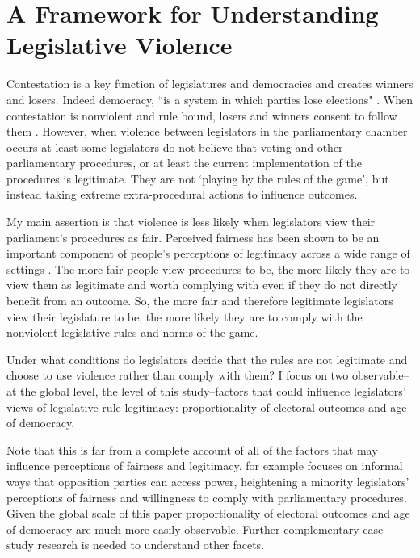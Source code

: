 \documentclass[a4paper]{article}\usepackage{graphicx, color}
\begin{document}

\section{A Framework for Understanding Legislative Violence}

Contestation is a key function of legislatures and democracies \citep{Alvarez1996, Dahl1971, Follesdal2006} and creates winners and losers. Indeed democracy, ``is a system in which parties lose elections" \citep[][10]{Przeworski1991}. When contestation is nonviolent and rule bound, losers and winners consent to follow them \citep[c.f.][]{Anderson2005}. However, when violence between legislators in the parliamentary chamber occurs at least some legislators do not believe that voting and other parliamentary procedures, or at least the current implementation of the procedures is legitimate. They are not `playing by the rules of the game', but instead taking extreme extra-procedural actions to influence outcomes.

My main assertion is that violence is less likely when legislators view their parliament's procedures as fair. Perceived fairness has been shown to be an important component of people's perceptions of legitimacy across a wide range of settings \citep[see][]{thibaut1975,Tyler2001,Tyler2006}. The more fair people view procedures to be, the more likely they are to view them as legitimate and worth complying with even if they do not directly benefit from an outcome. So, the more fair and therefore legitimate legislators view their legislature to be, the more likely they are to comply with the nonviolent legislative rules and norms of the game. 

Under what conditions do legislators decide that the rules are not legitimate and choose to use violence rather than comply with them? I focus on two observable--at the global level, the level of this study--factors that could influence legislators' views of legislative rule legitimacy: proportionality of electoral outcomes and age of democracy. 

Note that this is far from a complete account of all of the factors that may influence perceptions of fairness and legitimacy. \cite{Wolfe2004} for example focuses on informal ways that opposition parties can access power, heightening a minority legislators' perceptions of fairness and willingness to comply with parliamentary procedures. Given the global scale of this paper proportionality of electoral outcomes and age of democracy are much more easily observable. Further complementary case study research is needed to understand other facets.
\end{document}

